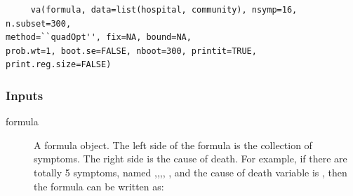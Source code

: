 \documentclass[oneside,letterpaper,titlepage]{article}
\begin{document}
\begin{verbatim}
     va(formula, data=list(hospital, community), nsymp=16, n.subset=300,
method=``quadOpt'', fix=NA, bound=NA, 
prob.wt=1, boot.se=FALSE, nboot=300, printit=TRUE, print.reg.size=FALSE)
\end{verbatim}

\subsubsection{Inputs}

\begin{description}
\item[formula] A formula object. The left side of the formula is the
  collection of symptoms. The right side is the cause of death.  For
  example, if there are totally 5 symptoms, named
  ,,,,
  , and the cause of death variable is
  , then the formula can be written as:


\end{description}
\end{document}

